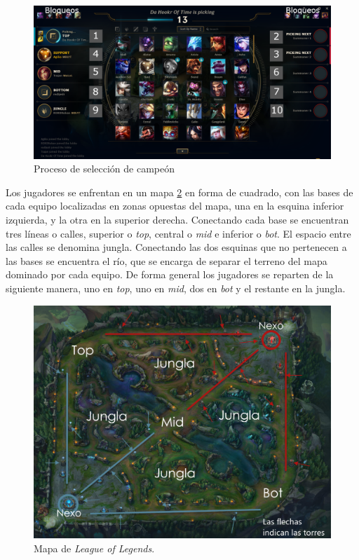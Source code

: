 \begin{figure}[h]
	\centering
	\includegraphics[width=1\linewidth]{img/early-pick}
	\caption{Proceso de selección de campeón}
	\label{fig:early-pick}
\end{figure}


Los jugadores se enfrentan en un mapa \ref{fig:mapa-lol} en forma de cuadrado, con las bases de cada equipo localizadas en zonas opuestas del mapa, una en la esquina inferior izquierda, y la otra en la superior derecha. Conectando cada base se encuentran tres líneas o calles, superior o \textit{top}, central o \textit{mid} e inferior o \textit{bot}. El espacio entre las calles se denomina jungla. Conectando las dos esquinas que no pertenecen a las bases se encuentra el río, que se encarga de separar el terreno del mapa dominado por cada equipo. De forma general los jugadores se reparten de la siguiente manera, uno en \textit{top}, uno en \textit{mid}, dos en \textit{bot} y el restante en la jungla.

\begin{figure}
	\centering
	\includegraphics[width=1\linewidth]{img/mapa-lol}
	\caption{Mapa de \textit{League of Legends}.}
	\label{fig:mapa-lol}
\end{figure}

